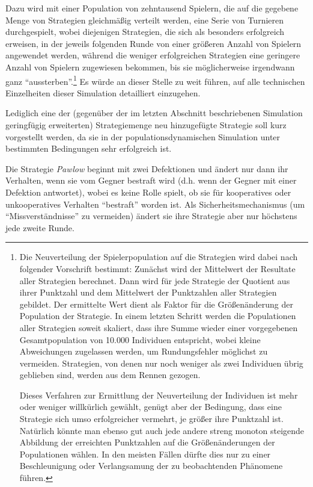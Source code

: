 \documentclass[12pt,a4paper,ngerman]{article}
\begin{document}
Dazu wird mit einer Population von zehntausend Spielern, die auf die
gegebene Menge von Strategien gleichmäßig verteilt werden, eine Serie
von Turnieren durchgespielt, wobei diejenigen Strategien, die sich als
besonders erfolgreich erweisen, in der jeweils folgenden Runde von
einer größeren Anzahl von Spielern angewendet werden, während die
weniger erfolgreichen Strategien eine geringere Anzahl von Spielern
zugewiesen bekommen, bis sie möglicherweise irgendwann ganz
"`aussterben"'.\footnote{ Die Neuverteilung der Spielerpopulation auf
  die Strategien wird dabei nach folgender Vorschrift bestimmt:
  Zunächst wird der Mittelwert der Resultate aller Strategien
  berechnet. Dann wird für jede Strategie der Quotient aus ihrer
  Punktzahl und dem Mittelwert der Punktzahlen aller Strategien
  gebildet. Der ermittelte Wert dient als Faktor für die
  Größenänderung der Population der Strategie. In einem letzten
  Schritt werden die Populationen aller Strategien soweit skaliert,
  dass ihre Summe wieder einer vorgegebenen Gesamtpopulation von
  10.000 Individuen entspricht, wobei kleine Abweichungen zugelassen
  werden, um Rundungsfehler möglichst zu vermeiden. Strategien, von
  denen nur noch weniger als zwei Individuen übrig geblieben sind,
  werden aus dem Rennen gezogen.

  Dieses Verfahren zur Ermittlung der Neuverteilung der Individuen ist
  mehr oder weniger willkürlich gewählt, genügt aber der Bedingung,
  dass eine Strategie sich umso erfolgreicher vermehrt, je größer ihre
  Punktzahl ist. Natürlich könnte man ebenso gut auch jede andere
  streng monoton steigende Abbildung der erreichten Punktzahlen auf
  die Größenänderungen der Populationen wählen. In den meisten Fällen
  dürfte dies nur zu einer Beschleunigung oder Verlangsamung der zu
  beobachtenden Phänomene führen.} Es würde an dieser Stelle zu weit
führen, auf alle technischen Einzelheiten dieser Simulation
detailliert einzugehen.

Lediglich eine der (gegenüber der im letzten Abschnitt beschriebenen
Simulation geringfügig erweiterten) Strategiemenge neu hinzugefügte
Strategie soll kurz vorgestellt werden, da sie in der
populationsdynamischen Simulation unter bestimmten Bedingungen sehr
erfolgreich ist.

Die Strategie {\em Pawlow} beginnt mit zwei Defektionen und ändert nur
dann ihr Verhalten, wenn sie vom Gegner bestraft wird (d.h. wenn der
Gegner mit einer Defektion antwortet), wobei es keine Rolle spielt,
ob sie für kooperatives oder unkooperatives Verhalten "`bestraft"'
worden ist. Als Sicherheitsmechanismus (um "`Missverständnisse"' zu
vermeiden) ändert sie ihre Strategie aber nur höchstens jede zweite
Runde.
\end{document}
